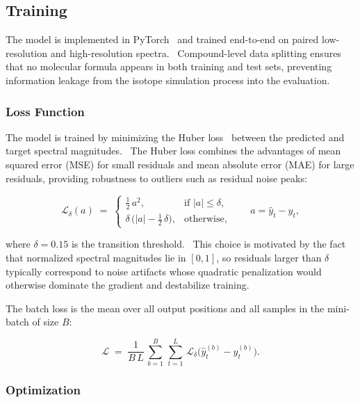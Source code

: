 \documentclass[12pt,a4paper]{report}
\begin{document}
\subsection{Training}
\label{sec:training}

The model is implemented in PyTorch~\cite{paszke2019} and trained end-to-end on paired low-resolution and high-resolution spectra.  Compound-level data splitting ensures that no molecular formula appears in both training and test sets, preventing information leakage from the isotope simulation process into the evaluation.

\subsubsection{Loss Function}

The model is trained by minimizing the Huber loss~\cite{huber1964} between the predicted and target spectral magnitudes.  The Huber loss combines the advantages of mean squared error (MSE) for small residuals and mean absolute error (MAE) for large residuals, providing robustness to outliers such as residual noise peaks:

\begin{equation}
\mathcal{L}_\delta(a) \;=\;
\begin{cases}
\frac{1}{2}\,a^2, & \text{if } |a| \le \delta, \\[4pt]
\delta\,\bigl(|a| - \tfrac{1}{2}\,\delta\bigr), & \text{otherwise},
\end{cases}
\qquad
a = \hat{y}_t - y_t,
\label{eq:huber}
\end{equation}

where $\delta = 0.15$ is the transition threshold.  This choice is motivated by the fact that normalized spectral magnitudes lie in $[0,1]$, so residuals larger than $\delta$ typically correspond to noise artifacts whose quadratic penalization would otherwise dominate the gradient and destabilize training.

The batch loss is the mean over all output positions and all samples in the mini-batch of size $B$:

\begin{equation}
\mathcal{L} \;=\; \frac{1}{B\,L}\,\sum_{b=1}^{B}\,\sum_{t=1}^{L}\,
\mathcal{L}_\delta\!\bigl(\hat{y}_t^{(b)} - y_t^{(b)}\bigr).
\label{eq:batch_loss}
\end{equation}

\subsubsection{Optimization}
\end{document}
